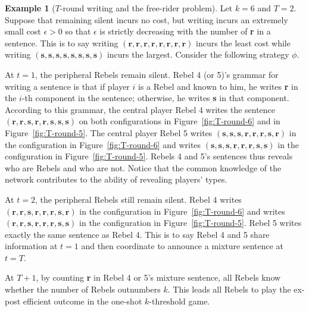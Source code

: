\documentclass[12pt,letter]{article}
\theoremstyle{definition}
\newtheorem{example}{Example}
\theoremstyle{remark}
\theoremstyle{claim}
\begin{document}
\begin{example}[$T$-round writing and the free-rider problem]
\label{ex:cost_function_talk_fr}
Let $k=6$ and $T=2$. Suppose that remaining silent incurs no cost, but writing incurs an extremely small cost $\epsilon>0$ so that $\epsilon$ is strictly decreasing with the number of \textbf{r} in a sentence. This is to say writing $(\textbf{r},\textbf{r},\textbf{r},\textbf{r},\textbf{r},\textbf{r},\textbf{r},\textbf{r})$ incurs the least cost while writing $(\textbf{s},\textbf{s},\textbf{s},\textbf{s},\textbf{s},\textbf{s},\textbf{s},\textbf{s})$ incurs the largest. Consider the following strategy $\phi$. 

At $t=1$, the peripheral Rebels remain silent. Rebel 4 (or 5)'s grammar for writing a sentence is that if player $i$ is a Rebel and known to him, he writes \textbf{r} in the $i$-th component in the sentence; otherwise, he writes \textbf{s} in that component. According to this grammar, the central player Rebel 4 writes the sentence $(\textbf{r},\textbf{r},\textbf{s},\textbf{r},\textbf{r},\textbf{s},\textbf{s},\textbf{s})$ on both configurations in Figure~\ref{fig:T-round-6} and in Figure~\ref{fig:T-round-5}. The central player Rebel 5 writes $(\textbf{s},\textbf{s},\textbf{s},\textbf{r},\textbf{r},\textbf{r},\textbf{s},\textbf{r})$ in the configuration in Figure~\ref{fig:T-round-6} and writes $(\textbf{s},\textbf{s},\textbf{s},\textbf{r},\textbf{r},\textbf{r},\textbf{s},\textbf{s})$ in the configuration in Figure~\ref{fig:T-round-5}. Rebels 4 and 5's sentences thus reveals who are Rebels and who are not. Notice that the common knowledge of the network contributes to the ability of revealing players' types. 

At $t=2$, the peripheral Rebels still remain silent. Rebel 4 writes $(\textbf{r},\textbf{r},\textbf{s},\textbf{r},\textbf{r},\textbf{r},\textbf{s},\textbf{r})$ in the configuration in Figure~\ref{fig:T-round-6} and writes $(\textbf{r},\textbf{r},\textbf{s},\textbf{r},\textbf{r},\textbf{r},\textbf{s},\textbf{s})$ in the configuration in Figure~\ref{fig:T-round-5}. Rebel 5 writes exactly the same sentence as Rebel 4. This is to say Rebel 4 and 5 share information at $t=1$ and then coordinate to announce a mixture sentence at $t=T$. 

At $T+1$, by counting \textbf{r} in Rebel 4 or 5's mixture sentence, all Rebels know whether the number of Rebels outnumbers $k$. This leads all Rebels to play the ex-post efficient outcome in the one-shot $k$-threshold game. 


\end{example}
\end{document}
